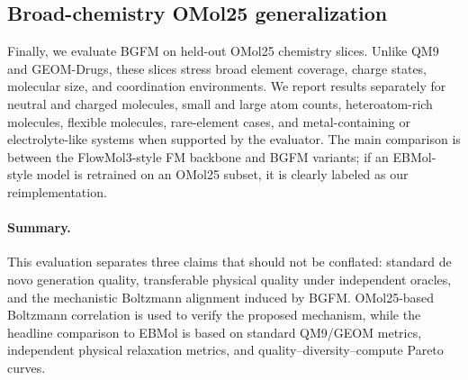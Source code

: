 \subsection{Broad-chemistry OMol25 generalization}

Finally, we evaluate BGFM on held-out OMol25 chemistry slices. Unlike QM9 and GEOM-Drugs, these slices stress broad element coverage, charge states, molecular size, and coordination environments. We report results separately for neutral and charged molecules, small and large atom counts, heteroatom-rich molecules, flexible molecules, rare-element cases, and metal-containing or electrolyte-like systems when supported by the evaluator. The main comparison is between the FlowMol3-style FM backbone and BGFM variants; if an EBMol-style model is retrained on an OMol25 subset, it is clearly labeled as our reimplementation.

\paragraph{Summary.}
This evaluation separates three claims that should not be conflated: standard de novo generation quality, transferable physical quality under independent oracles, and the mechanistic Boltzmann alignment induced by BGFM. OMol25-based Boltzmann correlation is used to verify the proposed mechanism, while the headline comparison to EBMol is based on standard QM9/GEOM metrics, independent physical relaxation metrics, and quality--diversity--compute Pareto curves.
